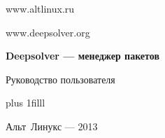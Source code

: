 
\Large
\thispagestyle{empty}
\begin{center}

www.altlinux.ru

www.deepsolver.org

\vspace{4cm}

{\LARGE \bf Deepsolver --- менеджер пакетов}

\vspace{1.0cm}

Руководство пользователя

\end{center}

\vskip 0pt plus 1filll

\begin{center}
Альт~Линукс --- 2013
\end{center}
